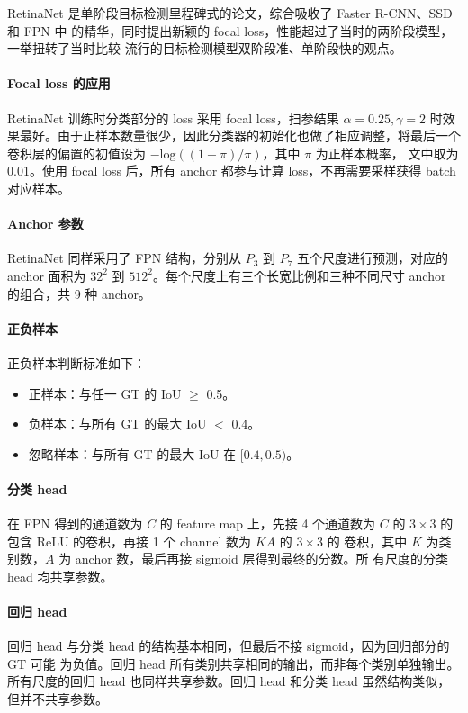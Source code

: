 RetinaNet 是单阶段目标检测里程碑式的论文，综合吸收了 Faster R-CNN、SSD 和 FPN 中
的精华，同时提出新颖的 focal loss，性能超过了当时的两阶段模型，一举扭转了当时比较
流行的目标检测模型双阶段准、单阶段快的观点。

\paragraph{Focal loss 的应用}
RetinaNet 训练时分类部分的 loss 采用 focal loss，扫参结果 $\alpha = 0.25, \gamma
= 2$ 时效果最好。由于正样本数量很少，因此分类器的初始化也做了相应调整，将最后一个
卷积层的偏置的初值设为 $-\mathrm{log}((1 - \pi)/ \pi)$，其中 $\pi$ 为正样本概率，
文中取为 0.01。使用 focal loss 后，所有 anchor 都参与计算 loss，不再需要采样获得
batch 对应样本。

\paragraph{Anchor 参数}
RetinaNet 同样采用了 FPN 结构，分别从 $P_3$ 到 $P_7$ 五个尺度进行预测，对应的
anchor 面积为 $32^2$ 到 $512^2$。每个尺度上有三个长宽比例和三种不同尺寸 anchor
的组合，共 9 种 anchor。

\paragraph{正负样本}
正负样本判断标准如下：
\begin{itemize}
\item 正样本：与任一 GT 的 IoU $\geq$ 0.5。
\item 负样本：与所有 GT 的最大 IoU $ < $ 0.4。
\item 忽略样本：与所有 GT 的最大 IoU 在 $[0.4, 0.5)$。
\end{itemize}

\paragraph{分类 head}
在 FPN 得到的通道数为 $C$ 的 feature map 上，先接 4 个通道数为 $C$ 的
$3 \times 3$ 的包含 ReLU 的卷积，再接 1 个 channel 数为 $KA$ 的 $3 \times 3$ 的
卷积，其中 $K$ 为类别数，$A$ 为 anchor 数，最后再接 sigmoid 层得到最终的分数。所
有尺度的分类 head 均共享参数。

\paragraph{回归 head}
回归 head 与分类 head 的结构基本相同，但最后不接 sigmoid，因为回归部分的 GT 可能
为负值。回归 head 所有类别共享相同的输出，而非每个类别单独输出。所有尺度的回归
head 也同样共享参数。回归 head 和分类 head 虽然结构类似，但并不共享参数。

